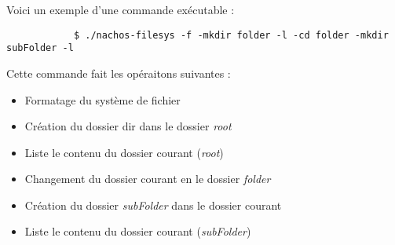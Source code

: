 \documentclass[a4paper,10pt]{article}
\begin{document}
        Voici un exemple d'une commande exécutable :
        \begin{lstlisting}
            $ ./nachos-filesys -f -mkdir folder -l -cd folder -mkdir subFolder -l
        \end{lstlisting}
        Cette commande fait les opéraitons suivantes :
        \begin{itemize}
            \item Formatage du système de fichier
            \item Création du dossier dir dans le dossier \textit{root}
            \item Liste le contenu du dossier courant (\textit{root})
            \item Changement du dossier courant en le dossier \textit{folder}
            \item Création du dossier \textit{subFolder} dans le dossier courant
            \item Liste le contenu du dossier courant (\textit{subFolder})
        \end{itemize}

%
%
%
\end{document}
